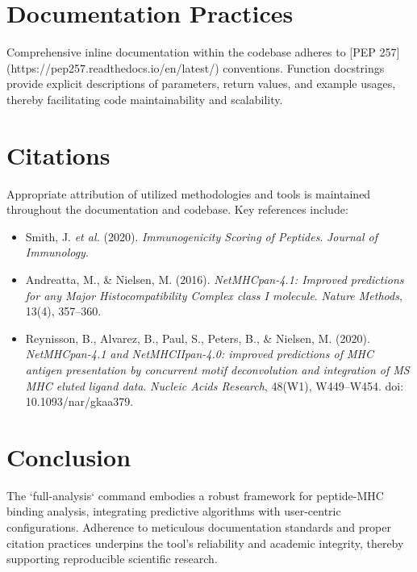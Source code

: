 \documentclass{article}
\begin{document}
\section{Documentation Practices}
Comprehensive inline documentation within the codebase adheres to [PEP 257] (https://pep257.readthedocs.io/en/latest/) conventions. Function docstrings provide explicit descriptions of parameters, return values, and example usages, thereby facilitating code maintainability and scalability.

\section{Citations}
Appropriate attribution of utilized methodologies and tools is maintained throughout the documentation and codebase. Key references include:
\begin{itemize}
    \item Smith, J. \textit{et al.} (2020). \textit{Immunogenicity Scoring of Peptides}. \textit{Journal of Immunology}.
    \item Andreatta, M., \& Nielsen, M. (2016). \textit{NetMHCpan-4.1: Improved predictions for any Major Histocompatibility Complex class I molecule}. \textit{Nature Methods}, 13(4), 357--360.
    \item Reynisson, B., Alvarez, B., Paul, S., Peters, B., \& Nielsen, M. (2020). \textit{NetMHCpan-4.1 and NetMHCIIpan-4.0: improved predictions of MHC antigen presentation by concurrent motif deconvolution and integration of MS MHC eluted ligand data}. \textit{Nucleic Acids Research}, 48(W1), W449--W454. doi: 10.1093/nar/gkaa379.
\end{itemize}

\section{Conclusion}
The `full-analysis` command embodies a robust framework for peptide-MHC binding analysis, integrating predictive algorithms with user-centric configurations. Adherence to meticulous documentation standards and proper citation practices underpins the tool's reliability and academic integrity, thereby supporting reproducible scientific research.



\end{document}
